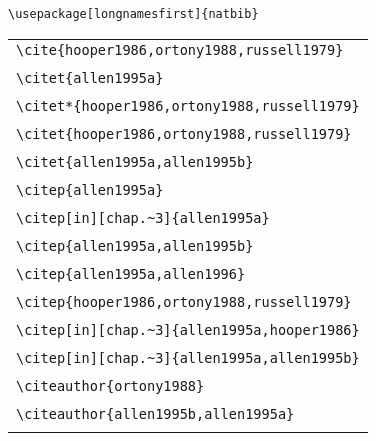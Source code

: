 \documentclass{article}
\begin{document}
\verb#\usepackage[longnamesfirst]{natbib}#\\

\begin{center}
\begin{tabular}{l}
\verb#\cite{hooper1986,ortony1988,russell1979}# \\
\cite{hooper1986,ortony1988,russell1979}  \\\hline \hline
%
\verb#\citet{allen1995a}# \\
 \citet{allen1995a} \\\hline
\verb#\citet*{hooper1986,ortony1988,russell1979}# \\
 \citet*{hooper1986,ortony1988,russell1979}  \\\hline
\verb#\citet{hooper1986,ortony1988,russell1979}# \\
 \citet{hooper1986,ortony1988,russell1979}  \\\hline
\verb#\citet{allen1995a,allen1995b}# \\
 \citet{allen1995a,allen1995b} \\\hline\hline
%
\verb#\citep{allen1995a}# \\
 \citep{allen1995a} \\\hline
\verb#\citep[in][chap.~3]{allen1995a}# \\
 \citep[in][chap.~3]{allen1995a} \\\hline
\verb#\citep{allen1995a,allen1995b}# \\
 \citep{allen1995a,allen1995b} \\\hline
\verb#\citep{allen1995a,allen1996}# \\
 \citep{allen1995a,allen1996} \\\hline
\verb#\citep{hooper1986,ortony1988,russell1979}# \\
 \citep{hooper1986,ortony1988,russell1979}  \\\hline
\verb#\citep[in][chap.~3]{allen1995a,hooper1986}# \\
 \citep[in][chap.~3]{allen1995a,hooper1986} \\\hline
[Fails in 1.9.15] \verb#\citep[in][chap.~3]{allen1995a,allen1995b}# \\
 \citep[in][chap.~3]{allen1995a,allen1995b} \\\hline
%
\verb#\citeauthor{ortony1988}# \\
 \citeauthor{ortony1988} \\\hline
\verb#\citeauthor{allen1995b,allen1995a}# \\
 \citeauthor{allen1995b,allen1995a} \\\hline

\end{tabular}
\end{center}
\end{document}
